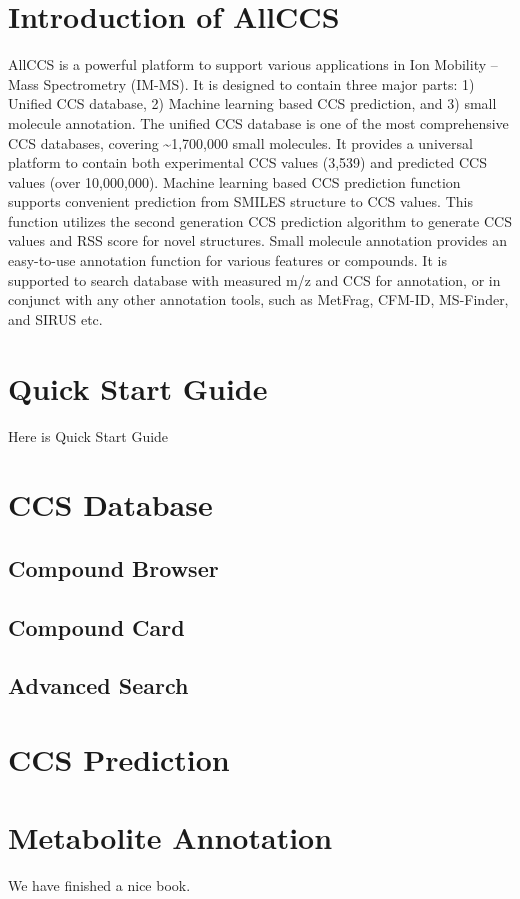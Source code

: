 \documentclass[12pt,]{book}
\begin{document}
\chapter{Introduction of AllCCS}\label{intro}

AllCCS is a powerful platform to support various applications in Ion
Mobility -- Mass Spectrometry (IM-MS). It is designed to contain three
major parts: 1) Unified CCS database, 2) Machine learning based CCS
prediction, and 3) small molecule annotation. The unified CCS database
is one of the most comprehensive CCS databases, covering
\textasciitilde{}1,700,000 small molecules. It provides a universal
platform to contain both experimental CCS values (3,539) and predicted
CCS values (over 10,000,000). Machine learning based CCS prediction
function supports convenient prediction from SMILES structure to CCS
values. This function utilizes the second generation CCS prediction
algorithm to generate CCS values and RSS score for novel structures.
Small molecule annotation provides an easy-to-use annotation function
for various features or compounds. It is supported to search database
with measured m/z and CCS for annotation, or in conjunct with any other
annotation tools, such as MetFrag, CFM-ID, MS-Finder, and SIRUS etc.

\chapter{Quick Start Guide}\label{quick-start-guide}

Here is Quick Start Guide

\chapter{CCS Database}\label{ccs-database}

\section{Compound Browser}\label{compound-browser}

\section{Compound Card}\label{compound-card}

\section{Advanced Search}\label{advanced-search}

\chapter{CCS Prediction}\label{ccs-prediction}

\chapter{Metabolite Annotation}\label{metabolite-annotation}

We have finished a nice book.


\end{document}
